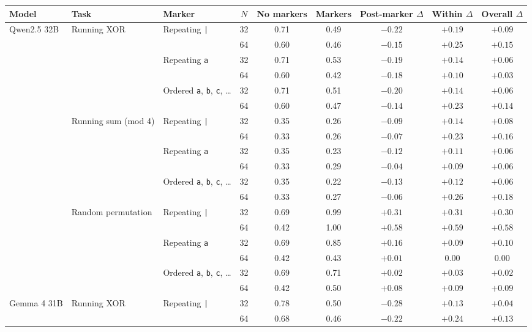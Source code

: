 \begin{tabular}{ll l c cc cc c}
\toprule
Model & Task & Marker & $N$ & No markers & Markers & Post-marker $\Delta$ & Within $\Delta$ & Overall $\Delta$ \\
\midrule
Qwen2.5 32B & Running XOR & Repeating \texttt{|} & 32 & 0.71 & 0.49 & $-0.22$ & $+0.19$ & $+0.09$ \\
 &  &  & 64 & 0.60 & 0.46 & $-0.15$ & $+0.25$ & $+0.15$ \\
 &  & Repeating \texttt{a} & 32 & 0.71 & 0.53 & $-0.19$ & $+0.14$ & $+0.06$ \\
 &  &  & 64 & 0.60 & 0.42 & $-0.18$ & $+0.10$ & $+0.03$ \\
 &  & Ordered \texttt{a}, \texttt{b}, \texttt{c}, \ldots & 32 & 0.71 & 0.51 & $-0.20$ & $+0.14$ & $+0.06$ \\
 &  &  & 64 & 0.60 & 0.47 & $-0.14$ & $+0.23$ & $+0.14$ \\
\addlinespace
 & Running sum (mod 4) & Repeating \texttt{|} & 32 & 0.35 & 0.26 & $-0.09$ & $+0.14$ & $+0.08$ \\
 &  &  & 64 & 0.33 & 0.26 & $-0.07$ & $+0.23$ & $+0.16$ \\
 &  & Repeating \texttt{a} & 32 & 0.35 & 0.23 & $-0.12$ & $+0.11$ & $+0.06$ \\
 &  &  & 64 & 0.33 & 0.29 & $-0.04$ & $+0.09$ & $+0.06$ \\
 &  & Ordered \texttt{a}, \texttt{b}, \texttt{c}, \ldots & 32 & 0.35 & 0.22 & $-0.13$ & $+0.12$ & $+0.06$ \\
 &  &  & 64 & 0.33 & 0.27 & $-0.06$ & $+0.26$ & $+0.18$ \\
\addlinespace
 & Random permutation & Repeating \texttt{|} & 32 & 0.69 & 0.99 & $+0.31$ & $+0.31$ & $+0.30$ \\
 &  &  & 64 & 0.42 & 1.00 & $+0.58$ & $+0.59$ & $+0.58$ \\
 &  & Repeating \texttt{a} & 32 & 0.69 & 0.85 & $+0.16$ & $+0.09$ & $+0.10$ \\
 &  &  & 64 & 0.42 & 0.43 & $+0.01$ & 0.00 & 0.00 \\
 &  & Ordered \texttt{a}, \texttt{b}, \texttt{c}, \ldots & 32 & 0.69 & 0.71 & $+0.02$ & $+0.03$ & $+0.02$ \\
 &  &  & 64 & 0.42 & 0.50 & $+0.08$ & $+0.09$ & $+0.09$ \\
\addlinespace
Gemma 4 31B & Running XOR & Repeating \texttt{|} & 32 & 0.78 & 0.50 & $-0.28$ & $+0.13$ & $+0.04$ \\
 &  &  & 64 & 0.68 & 0.46 & $-0.22$ & $+0.24$ & $+0.13$ \\

\end{tabular}
